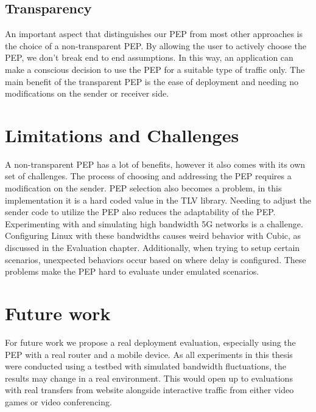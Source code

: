 \documentclass[a4paper,english, 11pt]{report}
\begin{document}
\subsection{Transparency}
An important aspect that distinguishes our PEP from most other approaches is the choice of a non-transparent PEP. By allowing the user to actively choose the PEP, we don't break end to end assumptions. In this way, an application can make a conscious decision to use the PEP for a suitable type of traffic only. The main benefit of the transparent PEP is the ease of deployment and needing no modifications on the sender or receiver side.\\

\section{Limitations and Challenges}

A non-transparent PEP has a lot of benefits, however it also comes with its own set of challenges. The process of choosing and addressing the PEP requires a modification on the sender. PEP selection also becomes a problem, in this implementation it is a hard coded value in the TLV library. Needing to adjust the sender code to utilize the PEP also reduces the adaptability of the PEP.\\

Experimenting with and simulating high bandwidth 5G networks is a challenge. Configuring Linux with these bandwidths causes weird behavior with Cubic, as discussed in the Evaluation chapter. Additionally, when trying to setup certain scenarios, unexpected behaviors occur based on where delay is configured. These problems make the PEP hard to evaluate under emulated scenarios.

\section{Future work}
For future work we propose a real deployment evaluation, especially using the PEP with a real router and a mobile device. As all experiments in this thesis were conducted using a testbed with simulated bandwidth fluctuations, the results may change in a real environment. This would open up to evaluations with real transfers from website alongside interactive traffic from either video games or video conferencing.\\
\end{document}
